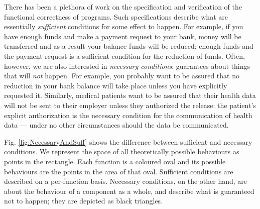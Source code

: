 There has been a plethora of work on the specification and verification of the
functional correctness of programs. Such specifications describe what are
essentially \emph{sufficient} conditions for some
effect to happen. For example, if you have enough funds and make a payment request to your bank, money will be transferred
and as a result your balance funds will be reduced: enough funds and the payment request is a sufficient condition for the
reduction of funds.
Often, however, we are also interested in \emph{necessary conditions}:
guarantees about things that will  \emph{not} happen.
%
For example, you  probably 
want to be assured that no reduction in your bank balance will take place unless you have
explicitly requested it. Similarly, medical patients want  to be assured  that   their health data will not be sent to  their employer  
unless they authorized the release:
the patient's explicit authorization is the
necessary condition for the communication of health data --- under no
other circumstances should the data be communicated.

Fig. \ref{fig:NecessaryAndSuff} shows
the difference between sufficient and necessary conditions. We
represent the space of all theoretically possible behaviours as points in the rectangle. 
Each function is a coloured oval and its possible behaviours are the points in the area of that oval.  
Sufficient conditions are described on a per-function basis. 
Necessary conditions, on the other hand, are about the behaviour of a component
as a whole, 
and describe what is guaranteed not to happen;
they are depicted as black triangles. 

